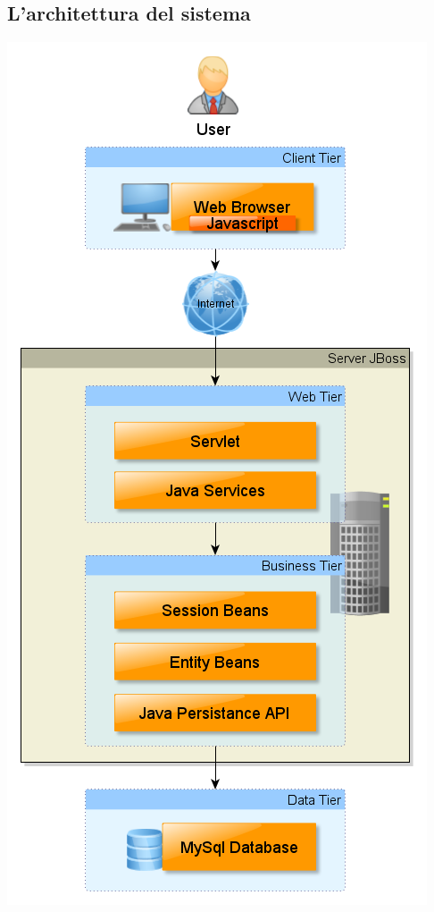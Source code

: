 \documentclass[a4paper,12pt]{article}
\begin{document}
\subsection{L'architettura del sistema}
\begin{center}
\includegraphics[scale=0.75]{tierdesign.png}
\end{center}
\end{document}

